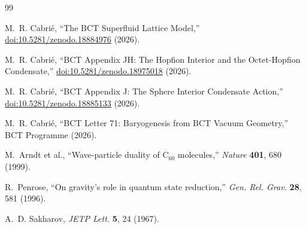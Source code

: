 \documentclass[aps,prl,twocolumn,superscriptaddress,showpacs]{revtex4-2}
\begin{document}
\begin{thebibliography}{99}

M.~R. Cabri\'{e},
``The BCT Superfluid Lattice Model,''
\href{https://doi.org/10.5281/zenodo.18884976}{doi:10.5281/zenodo.18884976} (2026).

M.~R. Cabri\'{e},
``BCT Appendix JH: The Hopfion Interior and the Octet-Hopfion Condensate,''
\href{https://doi.org/10.5281/zenodo.18975018}{doi:10.5281/zenodo.18975018} (2026).

M.~R. Cabri\'{e},
``BCT Appendix J: The Sphere Interior Condensate Action,''
\href{https://doi.org/10.5281/zenodo.18885133}{doi:10.5281/zenodo.18885133} (2026).

M.~R. Cabri\'{e},
``BCT Letter 71: Baryogenesis from BCT Vacuum Geometry,''
BCT Programme (2026).

M.~Arndt et al.,
``Wave-particle duality of C$_{60}$ molecules,''
\textit{Nature} \textbf{401}, 680 (1999).

R.~Penrose,
``On gravity's role in quantum state reduction,''
\textit{Gen. Rel. Grav.} \textbf{28}, 581 (1996).

A.~D. Sakharov,
\textit{JETP Lett.} \textbf{5}, 24 (1967).

\end{thebibliography}
\end{document}
